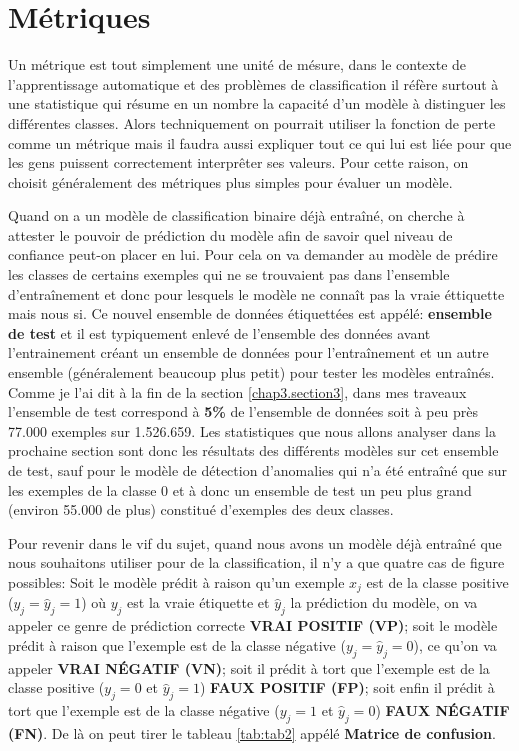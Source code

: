 \section{Métriques}
\label{chap5.section1}
Un métrique est tout simplement une unité de mésure, dans le contexte de l'apprentissage automatique et des problèmes de classification il réfère surtout à une statistique qui résume en un nombre la capacité d'un modèle à distinguer les différentes classes. Alors techniquement on pourrait utiliser la fonction de perte comme un métrique mais il faudra aussi expliquer tout ce qui lui est liée pour que les gens puissent correctement interprêter ses valeurs. Pour cette raison, on choisit généralement des métriques plus simples pour évaluer un modèle.

Quand on a un modèle de classification binaire déjà entraîné, on cherche à attester le pouvoir de prédiction du modèle afin de savoir quel niveau de confiance peut-on placer en lui. Pour cela on va demander au modèle de prédire les classes de certains exemples qui ne se trouvaient pas dans l'ensemble d'entraînement et donc pour lesquels le modèle ne connaît pas la vraie éttiquette mais nous si. Ce nouvel ensemble de données étiquettées est appélé: \textbf{ensemble de test} et il est typiquement enlevé de l'ensemble des données avant l'entrainement créant un ensemble de données pour l'entraînement et un autre ensemble (généralement beaucoup plus petit) pour tester les modèles entraînés. Comme je l'ai dit à la fin de la section \ref{chap3.section3}, dans mes traveaux l'ensemble de test correspond à \textbf{5\%} de l'ensemble de données soit à peu près 77.000 exemples sur 1.526.659. Les statistiques que nous allons analyser dans la prochaine section sont donc les résultats des différents modèles sur cet ensemble de test, sauf pour le modèle de détection d'anomalies qui n'a été entraîné que sur les exemples de la classe 0 et à donc un ensemble de test un peu plus grand (environ 55.000 de plus) constitué d'exemples des deux classes.

Pour revenir dans le vif du sujet, quand nous avons un modèle déjà entraîné que nous souhaitons utiliser pour de la classification, il n'y a que quatre cas de figure possibles: Soit le modèle prédit à raison qu'un exemple \(x_j\) est de la classe positive (\(y_j = \hat{y}_j = 1\)) où \(y_j\) est la vraie étiquette et \(\hat{y}_j\) la prédiction du modèle, on va appeler ce genre de prédiction correcte \textbf{VRAI POSITIF (VP)}; soit le modèle prédit à raison que l'exemple est de la classe négative (\(y_j = \hat{y}_j = 0\)), ce qu'on va appeler \textbf{VRAI NÉGATIF (VN)}; soit il prédit à tort que l'exemple est de la classe positive (\(y_j = 0\) et \(\hat{y}_j = 1\)) \textbf{FAUX POSITIF (FP)}; soit enfin il prédit à tort que l'exemple est de la classe négative (\(y_j = 1\) et \(\hat{y}_j = 0\)) \textbf{FAUX NÉGATIF (FN)}. De là on peut tirer le tableau \ref{tab:tab2} appélé \textbf{Matrice de confusion}.

